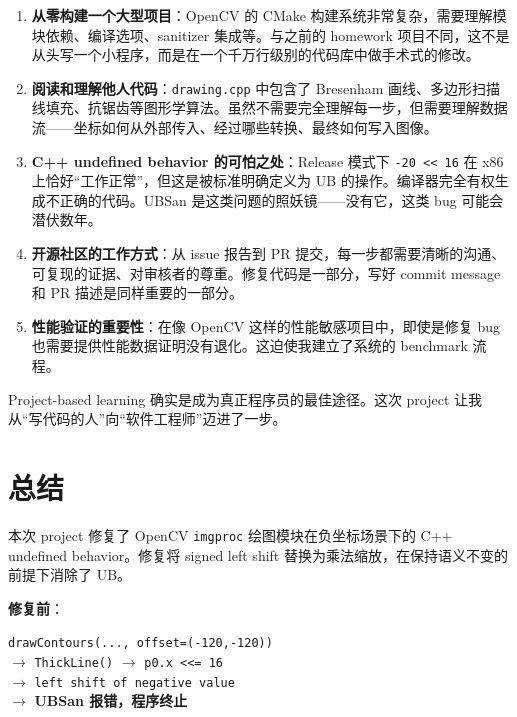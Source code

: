 \documentclass[12pt,a4paper]{article}
\begin{document}
\begin{enumerate}[leftmargin=*]
    \item \textbf{从零构建一个大型项目}：OpenCV 的 CMake 构建系统非常复杂，需要理解模块依赖、编译选项、sanitizer 集成等。与之前的 homework 项目不同，这不是从头写一个小程序，而是在一个千万行级别的代码库中做手术式的修改。
    
    \item \textbf{阅读和理解他人代码}：\texttt{drawing.cpp} 中包含了 Bresenham 画线、多边形扫描线填充、抗锯齿等图形学算法。虽然不需要完全理解每一步，但需要理解数据流——坐标如何从外部传入、经过哪些转换、最终如何写入图像。
    
    \item \textbf{C++ undefined behavior 的可怕之处}：Release 模式下 \texttt{-20 << 16} 在 x86 上恰好“工作正常”，但这是被标准明确定义为 UB 的操作。编译器完全有权生成不正确的代码。UBSan 是这类问题的照妖镜——没有它，这类 bug 可能会潜伏数年。
    
    \item \textbf{开源社区的工作方式}：从 issue 报告到 PR 提交，每一步都需要清晰的沟通、可复现的证据、对审核者的尊重。修复代码是一部分，写好 commit message 和 PR 描述是同样重要的一部分。
    
    \item \textbf{性能验证的重要性}：在像 OpenCV 这样的性能敏感项目中，即使是修复 bug 也需要提供性能数据证明没有退化。这迫使我建立了系统的 benchmark 流程。
\end{enumerate}

Project-based learning 确实是成为真正程序员的最佳途径。这次 project 让我从“写代码的人”向“软件工程师”迈进了一步。

\section{总结}

本次 project 修复了 OpenCV \texttt{imgproc} 绘图模块在负坐标场景下的 C++ undefined behavior。修复将 signed left shift 替换为乘法缩放，在保持语义不变的前提下消除了 UB。

\textbf{修复前}：
\begin{center}
\texttt{drawContours(..., offset=(-120,-120))} \\
$\rightarrow$ \texttt{ThickLine()} $\rightarrow$ \texttt{p0.x <<= 16} \\
$\rightarrow$ \texttt{left shift of negative value} \\
$\rightarrow$ \textbf{UBSan 报错，程序终止}
\end{center}
\end{document}
